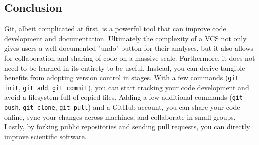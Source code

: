 \subsection{Conclusion}

Git, albeit complicated at first, is a powerful tool that can improve code development and documentation.
Ultimately the complexity of a VCS not only gives users a well-documented "undo" button for their analyses, but it also allows for collaboration and sharing of code on a massive scale.
Furthermore, it does not need to be learned in its entirety to be useful.
Instead, you can derive tangible benefits from adopting version control in stages.
With a few commands (\verb|git init|, \verb|git add|, \verb|git commit|), you can start tracking your code development and avoid a filesystem full of copied files.
Adding a few additional commands (\verb|git push|, \verb|git clone|, \verb|git pull|) and a GitHub account, you can share your code online, sync your changes across machines, and collaborate in small groups.
Lastly, by forking public repositories and sending pull requests, you can directly improve scientific software.
